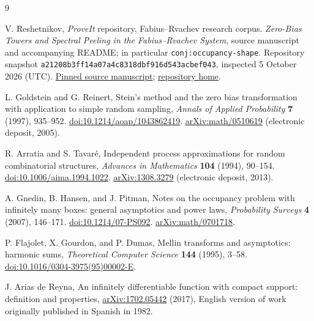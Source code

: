 \documentclass[11pt,a4paper]{article}
\numberwithin{equation}{section}
\theoremstyle{definition}
\theoremstyle{remark}
\newcommand{\repoURL}{https://github.com/VladimirReshetnikov/ProveIt}
\newcommand{\sourceURL}{https://github.com/VladimirReshetnikov/ProveIt/blob/a21208b3ff14a07a4c8318dbf916d543acbef043/Analysis/FabiusFunction/docs/semi-formalized-research-frontiers/drafts/representations/Fabius_Zero_Bias_Frontier_Report/Zero_Bias_Towers_and_Spectral_Peeling.tex}
\begin{document}
\begin{thebibliography}{9}
\raggedright
{}

V. Reshetnikov, \emph{ProveIt} repository, Fabius--Rvachev research corpus.
\emph{Zero-Bias Towers and Spectral Peeling in the Fabius--Rvachev System},
source manuscript and accompanying README; in particular
\texttt{conj:occupancy-shape}.
Repository snapshot \texttt{a21208b3ff14a07a4c8318dbf916d543acbef043},
inspected 5 October 2026 (UTC).
\href{\sourceURL}{Pinned source manuscript};
\href{\repoURL}{repository home}.

L. Goldstein and G. Reinert,
Stein's method and the zero bias transformation with application to simple
random sampling, \emph{Annals of Applied Probability} \textbf{7} (1997),
935--952.
\href{https://doi.org/10.1214/aoap/1043862419}{doi:10.1214/aoap/1043862419}.
\href{https://arxiv.org/abs/math/0510619}{arXiv:math/0510619}
(electronic deposit, 2005).

R. Arratia and S. Tavar\'e,
Independent process approximations for random combinatorial structures,
\emph{Advances in Mathematics} \textbf{104} (1994), 90--154.
\href{https://doi.org/10.1006/aima.1994.1022}{doi:10.1006/aima.1994.1022}.
\href{https://arxiv.org/abs/1308.3279}{arXiv:1308.3279}
(electronic deposit, 2013).

A. Gnedin, B. Hansen, and J. Pitman,
Notes on the occupancy problem with infinitely many boxes: general
asymptotics and power laws,
\emph{Probability Surveys} \textbf{4} (2007), 146--171.
\href{https://doi.org/10.1214/07-PS092}{doi:10.1214/07-PS092}.
\href{https://arxiv.org/abs/math/0701718}{arXiv:math/0701718}.

P. Flajolet, X. Gourdon, and P. Dumas,
Mellin transforms and asymptotics: harmonic sums,
\emph{Theoretical Computer Science} \textbf{144} (1995), 3--58.
\href{https://doi.org/10.1016/0304-3975(95)00002-E}
{doi:10.1016/0304-3975(95)00002-E}.

J. Arias de Reyna,
An infinitely differentiable function with compact support: definition
and properties,
\href{https://arxiv.org/abs/1702.05442}{arXiv:1702.05442} (2017),
English version of work originally published in Spanish in 1982.

\end{thebibliography}
\end{document}

